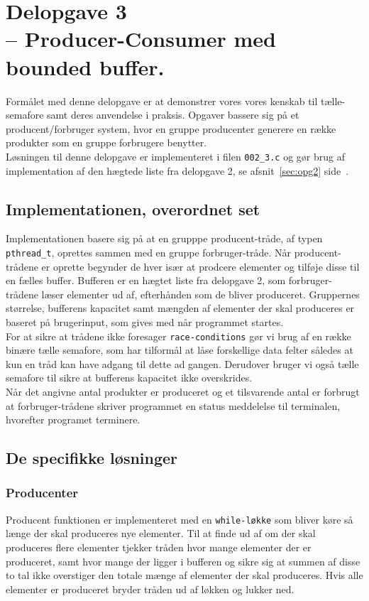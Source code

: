 \documentclass[main.tex]{subfile}
\begin{document}
\section{Delopgave 3\\\normalsize{-- Producer-Consumer med bounded buffer.}}
Formålet med denne delopgave er at demonstrer vores vores kenskab til tælle-semafore samt deres anvendelse i praksis. Opgaver bassere sig på et producent/forbruger system, hvor en gruppe producenter generere en række produkter som en gruppe forbrugere benytter.\\

Løsningen til denne delopgave er implementeret i filen \texttt{002\_3.c} og gør brug af implementation af den hægtede liste fra delopgave 2, se afsnit~\ref{sec:opg2} side~\pageref{sec:opg2}.

\subsection{Implementationen, overordnet set}
Implementationen basere sig på at en grupppe producent-tråde, af typen \texttt{pthread\_t}, oprettes sammen med en gruppe forbruger-tråde. Når producent-trådene er oprette begynder de hver især at prodcere elementer og tilføje disse til en fælles buffer. Bufferen er en hægtet liste fra delopgave 2, som forbruger-trådene læser elementer ud af, efterhånden som de bliver produceret. Gruppernes størrelse, bufferens kapacitet samt mængden af elementer der skal produceres er baseret på brugerinput, som gives med når programmet startes.\\

For at sikre at trådene ikke foresager \texttt{race-conditions} gør vi brug af en række binære tælle semafore, som har tilformål at låse forskellige data felter således at kun en tråd kan have adgang til dette ad gangen. Derudover bruger vi også tælle semafore til sikre at bufferens kapacitet ikke overskrides.\\

Når det angivne antal produkter er produceret og et tilsvarende antal er forbrugt at forbruger-trådene skriver programmet en status meddelelse til terminalen, hvorefter programet terminere. 

\subsection{De specifikke løsninger}
\subsubsection{Producenter}
Producent funktionen er implementeret med en \texttt{while-løkke} som bliver køre så længe der skal produceres nye elementer. Til at finde ud af om der skal produceres flere elementer tjekker tråden hvor mange elementer der er produceret, samt hvor mange der ligger i bufferen og sikre sig at summen af disse to tal ikke overstiger den totale mænge af elementer der skal produceres. Hvis alle elementer er produceret bryder tråden ud af løkken og lukker ned.\\
\end{document}
